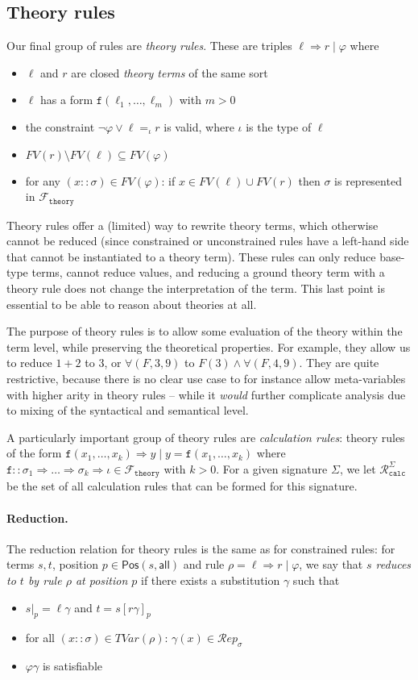 \documentclass{lmcs}
\theoremstyle{theorem}\newtheorem{theorem}{Theorem}
\theoremstyle{theorem}\newtheorem{lemma}[theorem]{Lemma}
\theoremstyle{theorem}\newtheorem{corollary}[theorem]{Corollary}
\theoremstyle{definition}\newtheorem{definition}[theorem]{Definition}
\theoremstyle{definition}\newtheorem{example}[theorem]{Example}
\newcommand{\thF}{\mathcal{F}_{\mathtt{theory}}}
\newcommand{\Rulescalc}{\mathcal{R}_{\mathtt{calc}}}
\newcommand{\FV}{\mathit{FV}}
\newcommand{\Positions}{\mathsf{Pos}}
\newcommand{\Reps}[1]{\mathcal{R}\!\mathit{ep}_{#1}}
\newcommand{\TLVar}[1]{\mathit{TVar}(#1)}
\newcommand{\asort}{\iota}
\newcommand{\atype}{\sigma}
\newcommand{\identifier}[1]{\mathtt{#1}}
\newcommand{\afun}{\identifier{f}}
\newcommand{\avar}{x}
\newcommand{\bvar}{y}
\newcommand{\arrtype}{\Rightarrow}
\newcommand{\arrz}{\Rightarrow}
\newcommand{\myparagraph}[1]{\paragraph{\textbf{#1.}}}
\begin{document}
\subsection{Theory rules}

Our final group of rules are \emph{theory rules}.  These are triples $\ell
\arrz r \mid \varphi$ where
\begin{itemize}
\item $\ell$ and $r$ are closed \emph{theory terms} of the same sort
\item $\ell$ has a form $\afun(\ell_1,\dots,\ell_m)$ with $m > 0$
\item the constraint $\neg \varphi \vee \ell =_\asort r$ is valid, where
  $\asort$ is the type of $\ell$
\item $\FV(r) \setminus \FV(\ell) \subseteq \FV(\varphi)$
\item for any $(\avar :: \atype) \in \FV(\varphi)$:
  if $\avar \in \FV(\ell) \cup \FV(r)$ then $\atype$ is represented in
  $\thF$
\end{itemize}

Theory rules offer a (limited) way to rewrite theory terms, which otherwise
cannot be reduced (since constrained or unconstrained rules have a left-hand
side that cannot be instantiated to a theory term).  These rules can only
reduce base-type terms, cannot reduce values, and reducing a ground theory
term with a theory rule does not change the interpretation of the term.
This last point is essential to be able to reason about theories at all.

The purpose of theory rules is to allow some evaluation of the theory within the
term level, while preserving the theoretical properties.  For example, they
allow us to reduce $1+2$ to $3$, or $\forall(F,3,9)$ to $F(3) \wedge \forall(F,
4,9)$.  They are quite restrictive, because there is no clear use case to for
instance allow meta-variables with higher arity in theory rules -- while it
\emph{would} further complicate analysis due to mixing of the syntactical and
semantical level.

A particularly important group of theory rules are \emph{calculation rules}:
theory rules of the form
  $\afun(\avar_1,\dots,\avar_k) \arrz \bvar \mid \bvar = \afun(\avar_1,\dots,
  \avar_k)$ where $\afun :: \atype_1 \arrtype \dots \arrtype \atype_k \arrtype
  \asort \in \thF$ with $k > 0$.
For a given signature $\Sigma$, we let $\Rulescalc^\Sigma$ be the set of all
calculation rules that can be formed for this signature.

\myparagraph{Reduction}
The reduction relation for theory rules is the same as for constrained rules:
for terms $s,t$, position $p \in \Positions(s,\mathsf{all})$ and rule $\rho =
\ell \arrz r \mid \varphi$, we say that \emph{$s$ reduces to $t$ by rule $\rho$
at position $p$} if there exists a substitution $\gamma$ such that
\begin{itemize}
\item $s|_p = \ell\gamma$ and $t = s[r\gamma]_p$
\item for all $(\avar :: \atype) \in \TLVar{\rho}$:
  $\gamma(\avar) \in \Reps{\atype}$
\item $\varphi\gamma$ is satisfiable
\end{itemize}
\end{document}
